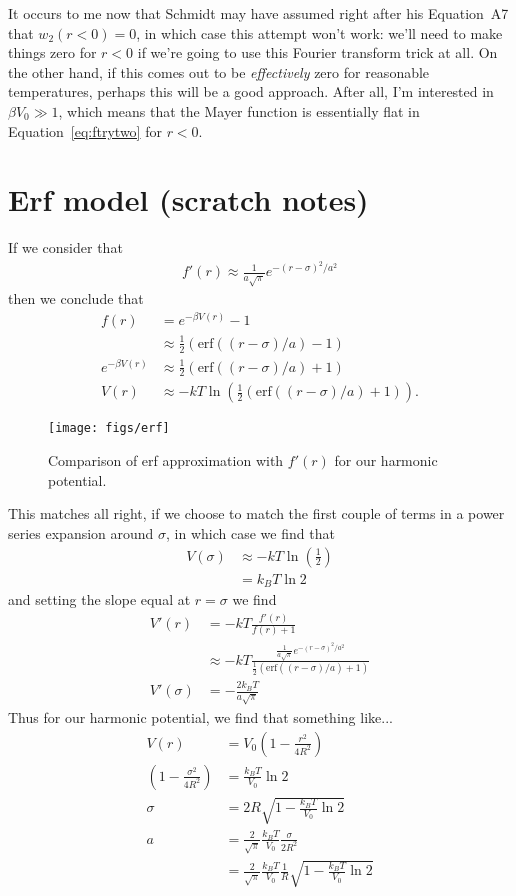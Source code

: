 \documentclass[letterpaper,twocolumn,amsmath,amssymb,prb]{revtex4-1}
\begin{document}
It occurs to me now that Schmidt may have assumed right after his
Equation~A7 that $w_2(r<0)=0$, in which case this attempt won't work:
we'll need to make things zero for $r<0$ if we're going to use this
Fourier transform trick at all.  On the other hand, if this comes out
to be \emph{effectively} zero for reasonable temperatures, perhaps
this will be a good approach.  After all, I'm interested in $\beta V_0
\gg 1$, which means that the Mayer function is essentially flat in
Equation~\ref{eq:ftrytwo} for $r<0$.

\section{Erf model (scratch notes)}
If we consider that
\begin{align}
  f'(r) \approx \frac{1}{a\sqrt{\pi}} e^{-(r-\sigma)^2/a^2}
\end{align}
then we conclude that
\begin{align}
  f(r) &= e^{-\beta V(r)} - 1 \\
  &\approx \tfrac12 ( \mathrm{erf}((r-\sigma)/a) - 1 ) \\
  e^{-\beta V(r)} &\approx \tfrac12 ( \mathrm{erf}((r-\sigma)/a) + 1 ) \\
  V(r) &\approx -kT\ln\left(\tfrac12 ( \mathrm{erf}((r-\sigma)/a) + 1 )\right).
\end{align}
\begin{figure}
  \texttt{[image: figs/erf]}
  \caption{Comparison of erf approximation with $f'(r)$ for our
    harmonic potential.}
\end{figure}
This matches all right, if we choose to match the first couple of
terms in a power series expansion around $\sigma$, in which case we
find that
\begin{align}
  V(\sigma) &\approx -kT\ln\left(\tfrac12\right) \\
  &= k_BT \ln 2
\end{align}
and setting the slope equal at $r=\sigma$ we find
\begin{align}
  V'(r) &= -kT \frac{f'(r)}{f(r)+1} \\
  &\approx -kT \frac{\frac{1}{a\sqrt{\pi}} e^{-(r-\sigma)^2/a^2}}{\tfrac12 ( \mathrm{erf}((r-\sigma)/a) + 1 )}
  \\
  V'(\sigma) &= -\frac{2k_BT}{a\sqrt{\pi}}
\end{align}
Thus for our harmonic potential, we find that something like...
\begin{align}
  V(r) &= V_0 \left(1-\frac{r^2}{4R^2}\right)\\
  \left(1 - \frac{\sigma^2}{4R^2}\right) &= \frac{k_BT}{V_0}\ln 2 \\
  \sigma &= 2R\sqrt{1 - \frac{k_BT}{V_0}\ln 2} \\
  a &= \frac{2}{\sqrt\pi}\frac{k_BT}{V_0}\frac{\sigma}{2R^2} \\
  &= \frac{2}{\sqrt\pi}\frac{k_BT}{V_0}\frac{1}{R}\sqrt{1 - \frac{k_BT}{V_0}\ln2}
\end{align}
\end{document}
